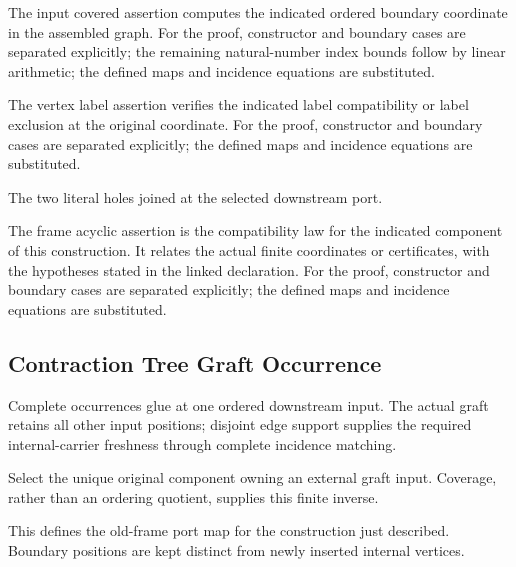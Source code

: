 The input covered assertion computes the indicated ordered boundary coordinate in the assembled graph.
For the proof, constructor and boundary cases are separated explicitly; the remaining natural-number index bounds follow by linear arithmetic; the defined maps and incidence equations are substituted.
\par{}

The vertex label assertion verifies the indicated label compatibility or label exclusion at the original coordinate.
For the proof, constructor and boundary cases are separated explicitly; the defined maps and incidence equations are substituted.
\par{}

The two literal holes joined at the selected downstream port.
\par{}

The frame acyclic assertion is the compatibility law for the indicated component of this construction. It relates the actual finite coordinates or certificates, with the hypotheses stated in the linked declaration.
For the proof, constructor and boundary cases are separated explicitly; the defined maps and incidence equations are substituted.
\par{}

\subsection{Contraction Tree Graft Occurrence}
Complete occurrences glue at one ordered downstream input. The actual graft retains all other input positions; disjoint edge support supplies the required internal-carrier freshness through complete incidence matching.

Select the unique original component owning an external graft input. Coverage, rather than an ordering quotient, supplies this finite inverse.
\par{}

This defines the old-frame port map for the construction just described. Boundary positions are kept distinct from newly inserted internal vertices.
\par{}

